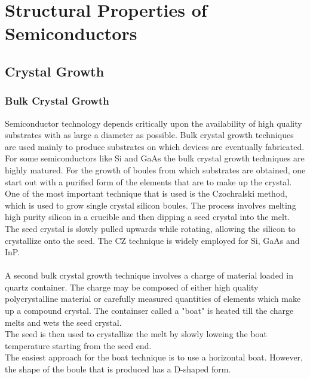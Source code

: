 \chapter{Structural Properties of Semiconductors}

\section{Crystal Growth}
\subsection{Bulk Crystal Growth}
Semiconductor technology depends critically upon the availability  of high quality substrates with as large a diameter as possible. Bulk crystal growth techniques are used mainly
to produce substrates on which devices are eventually fabricated. For some semiconductors like Si and GaAs the bulk crystal growth techniques are highly matured.
For the growth of boules from which substrates are obtained, one start out with a purified form of the elements that are to make up the crystal. \\
One of the most important technique that is used is the Czochralski method, which is used to grow single crystal silicon boules. The process involves melting high purity silicon in a crucible and then dipping a seed crystal into the melt. The seed crystal is slowly pulled upwards while rotating, allowing the silicon to crystallize onto the seed.
The CZ technique is widely employed for Si, GaAs and InP.\\\\
A second bulk crystal growth technique involves a charge of material loaded in quartz container. The charge may be composed of either high quality polycrystalline material or carefully measured quantities of elements which make up a compound
crystal. The containser called a "boat" is heated till the charge melts and wets the seed crystal.\\
The seed is then used to crystallize the melt by slowly loweing the boat temperature starting from the seed end.\\
The easiest approach for the boat technique is to use a horizontal boat. However, the shape of the boule that is produced has a D-shaped form.
